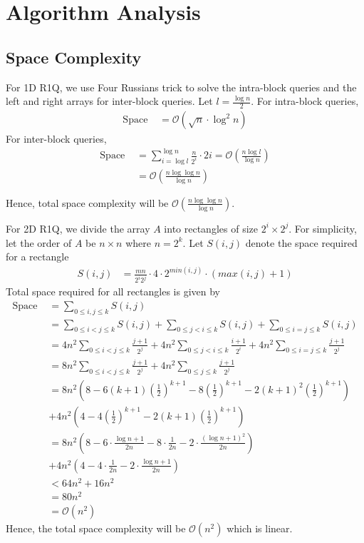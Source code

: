 \documentclass{article}
\begin{document}
\section{Algorithm Analysis}
\subsection{Space Complexity}
For 1D R1Q, we use Four Russians trick to solve the intra-block queries and the left and right arrays for inter-block queries. Let $l = \frac{\log n}{2}$. For intra-block queries,
\begin{align}
\text{Space } &= \mathcal{O}\left( \sqrt n \cdot \log^2 n  \right) 
\end{align}
For inter-block queries,
\begin{align}
\text{Space } &= \sum_{i = \log l}^{\log n} \frac{n}{2^i} \cdot 2i = \mathcal{O} \left( \frac{n \log l}{\log n} \right) \\ 
&= \mathcal{O} \left( \frac{n \log \log n}{\log n} \right)
\end{align}

Hence, total space complexity will be $\mathcal{O}\left( \frac{n \log \log n}{\log n} \right)$.

For 2D R1Q, we divide the array $A$ into rectangles of size $2^i \times 2^j$. For simplicity, let the order of $A$ be $n \times n$ where $n=2^k$. Let $S(i, j)$ denote the space required for a rectangle
\begin{align}
S(i, j) &= \frac{mn}{2^i 2^j} \cdot 4 \cdot  2^{min(i, j)} \cdot (max(i, j)+1)
\end{align}
Total space required for all rectangles is given by
\begin{align}
\text{Space } &= \sum_{0 \le i,j \le k}S(i, j) \\
&= \sum_{0 \le i < j \le k} S(i, j) + \sum_{0 \le j < i \le k} S(i, j) + \sum_{0 \le i=j \le k} S(i, j) \\
&= 4n^2 \sum_{0 \le i < j \le k} \frac{j+1}{2^j} + 4n^2 \sum_{0 \le j < i \le k} \frac{i+1}{2^i} + 4n^2 \sum_{0 \le i = j \le k} \frac{j+1}{2^j} \\
&= 8n^2 \sum_{0 \le i < j \le k} \frac{j+1}{2^j} + 4n^2 \sum_{0 \le j \le k} \frac{j+1}{2^j} \\
&= 8n^2 \left( 8 - 6 (k+1) \left(\frac{1}{2} \right)^{k+1}  - 8 \left(\frac{1}{2} \right)^{k+1} - 2 (k+1)^2 \left(\frac{1}{2} \right)^{k+1} \right) \\
 &+ 4n^2 \left( 4 - 4 \left(\frac{1}{2} \right)^{k+1} - 2 (k+1) \left(\frac{1}{2} \right)^{k+1} \right) \\
&= 8n^2 \left( 8 - 6 \cdot \frac{\log n + 1}{2n}  - 8 \cdot \frac{1}{2n} - 2 \cdot \frac{(\log n + 1)^2}{2n} \right) \\
 &+ 4n^2 \left( 4 - 4\cdot \frac{1}{2n} - 2 \cdot \frac{\log n + 1}{2n}  \right) \\
&< 64n^2 + 16n^2 \\
&= 80n^2 \\
&= \mathcal{O}(n^2)
\end{align}
Hence, the total space complexity will be $\mathcal{O}(n^2)$ which is linear.
\end{document}
